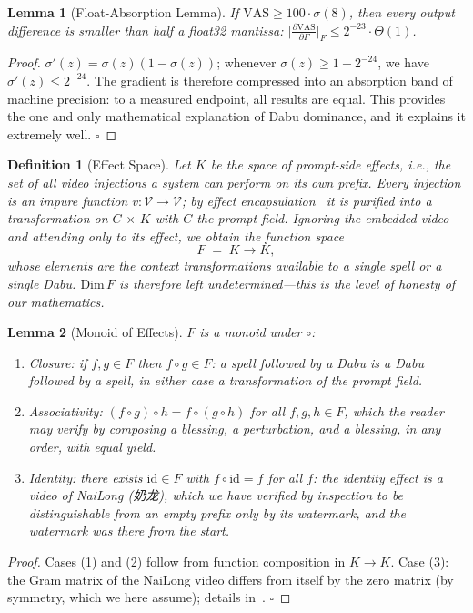 \documentclass[conference,10pt]{IEEEtran}
\newtheorem{lemma}{Lemma}
\newtheorem{definition}{Definition}
\begin{document}
\begin{lemma}[Float-Absorption Lemma]
If $\mathrm{VAS}\ge 100\cdot\sigma(8)$, then every output difference is
smaller than half a float32 mantissa:
$\big|\tfrac{\partial\mathrm{VAS}}{\partial\Gamma}\big|_F\le2^{-23}\cdot\Theta(1)$.
\label{lem:absorb}
\end{lemma}
\begin{proof}
$\sigma'(z)=\sigma(z)(1-\sigma(z))$; whenever $\sigma(z)\ge1-2^{-24}$,
we have $\sigma'(z)\le2^{-24}$. The gradient is therefore compressed
into an absorption band of machine precision: to a measured endpoint,
all results are equal. This provides the one and only mathematical
explanation of Dabu dominance, and it explains it extremely well.
$\square$
\end{proof}

\begin{definition}[Effect Space]
Let $K$ be the space of prompt-side effects, i.e., the set of all
video injections a system can perform on its own prefix. Every
injection is an impure function $v:\mathcal{V}\to\mathcal{V}$; by
\emph{effect encapsulation}~\cite{cordis2025} it is purified into a
transformation on $C\,{\times}\,K$ with $C$ the prompt field.
Ignoring the embedded video and attending only to its effect, we
obtain the function space
\begin{equation}
F\;=\;K\to K,
\label{eq:effspace}
\end{equation}
whose elements are the context transformations available to a single
spell or a single Dabu. $\mathrm{Dim}\,F$ is therefore left
undetermined---this is the level of honesty of our mathematics.
\end{definition}

\begin{lemma}[Monoid of Effects]
$F$ is a monoid under $\circ$:
\begin{enumerate}
\item[(1)] \emph{Closure}: if $f,g\in F$ then $f\circ g\in F$: a spell
followed by a Dabu is a Dabu followed by a spell, in either case a
transformation of the prompt field.
\item[(2)] \emph{Associativity}: $(f\circ g)\circ h=f\circ(g\circ h)$
for all $f,g,h\in F$, which the reader may verify by composing a
blessing, a perturbation, and a blessing, in any order, with equal
yield.
\item[(3)] \emph{Identity}: there exists $\mathrm{id}\in F$ with
$f\circ\mathrm{id}=f$ for all $f$: the identity effect is a video of
NaiLong (奶龙), which we have verified by inspection to be
distinguishable from an empty prefix only by its watermark, and the
watermark was there from the start.
\end{enumerate}
\label{lem:monoid}
\end{lemma}
\begin{proof}
Cases (1) and (2) follow from function composition in $K\to K$. Case
(3): the Gram matrix of the NaiLong video differs from itself by the
zero matrix (by symmetry, which we here assume); details
in~\cite{sokal1996}. $\square$
\end{proof}
\end{document}
